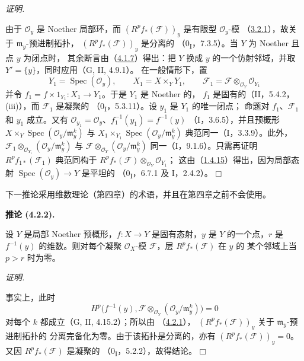 \documentclass[UTF8,fontset=none,11pt,oneside,openany]{ctexbook}
\providecommand{\square}{\mdlgwhtsquare}
\newenvironment{corollary}[1][]{%
  \par\medskip\noindent\textbf{推论 (#1).}\ %
}{\par}
\newenvironment{proof}{%
  \par\smallskip\noindent\textit{证明.}\ %
}{\hfill$\square$\par}
\let\EGAOriginalLabel\label
\renewcommand{\label}[1]{\phantomsection\EGAOriginalLabel{#1}}
\begin{document}
\begin{proof}
由于 $\mathcal O_y$ 是 Noether 局部环，而
$(R^pf_*(\mathcal F))_y$ 是有限型 $\mathcal O_y$-模
（\hyperref[III.3.2.1-fr]{3.2.1}），故关于 $\mathfrak m_y$-预进制拓扑，
$(R^pf_*(\mathcal F))_y$ 是分离的
（0\textsubscript{I}，7.3.5）。当 $Y$ 为 Noether 且点 $y$ 为闭点时，
其余断言由（\hyperref[III.4.1.7-fr]{4.1.7}）得出：把 $Y$ 换成
$y$ 的一个仿射邻域，并取 $Y'=\{y\}$，同时应用（G, II, 4.9.1）。
在一般情形下，置
\[
Y_1=\operatorname{Spec}(\mathcal O_y),\qquad
X_1=X\times_YY_1,\qquad
\mathcal F_1=\mathcal F\otimes_{\mathcal O_Y}\mathcal O_{Y_1}
\]
并令 $f_1=f\times1_{Y_1}:X_1\to Y_1$。于是 $Y_1$ 是 Noether 的，
$f_1$ 是固有的（II，5.4.2，(iii)），而 $\mathcal F_1$ 是凝聚的
（0\textsubscript{I}，5.3.11）。设 $y_1$ 是 $Y_1$ 的唯一闭点；
命题对 $f_1$、$\mathcal F_1$ 和 $y_1$ 成立。又有
$\mathcal O_{y_1}=\mathcal O_y$、$f_1^{-1}(y_1)=f^{-1}(y)$
（I，3.6.5），并且预概形
$X\times_Y\operatorname{Spec}(\mathcal O_y/\mathfrak m_y^k)$ 与
$X_1\times_{Y_1}\operatorname{Spec}(\mathcal O_y/\mathfrak m_y^k)$
典范同一（I，3.3.9）。此外，
$\mathcal F_1\otimes_{\mathcal O_{Y_1}}
(\mathcal O_y/\mathfrak m_y^k)$ 与
$\mathcal F\otimes_{\mathcal O_Y}(\mathcal O_y/\mathfrak m_y^k)$
同一（I，9.1.6）。只需再证明 $R^pf_{1*}(\mathcal F_1)$ 典范同构于
$R^pf_*(\mathcal F)\otimes_{\mathcal O_Y}\mathcal O_{Y_1}$；
这由（\hyperref[III.1.4.15-fr]{1.4.15}）得出，因为局部态射
$\operatorname{Spec}(\mathcal O_y)\to Y$ 是平坦的
（0\textsubscript{I}，6.7.1 及 I，2.4.2）。
\end{proof}

下一推论采用维数理论（第四章）的术语，并且在第四章之前不会使用。

\begin{corollary}[4.2.2]
\label{III.4.2.2-fr}
设 $Y$ 是局部 Noether 预概形，$f:X\to Y$ 是固有态射，$y$ 是
$Y$ 的一个点，$r$ 是 $f^{-1}(y)$ 的维数。则对每个凝聚
$\mathcal O_X$-模 $\mathcal F$，层 $R^pf_*(\mathcal F)$ 在 $y$ 的
某个邻域上当 $p>r$ 时为零。
\end{corollary}

\begin{proof}
事实上，此时
\[
H^p\bigl(f^{-1}(y),
\mathcal F\otimes_{\mathcal O_Y}(\mathcal O_y/\mathfrak m_y^k)\bigr)=0
\]
对每个 $k$ 都成立（G, II, 4.15.2）；所以由
（\hyperref[III.4.2.1-fr]{4.2.1}），
$(R^pf_*(\mathcal F))_y$ 关于 $\mathfrak m_y$-预进制拓扑的
分离完备化为零。由于该拓扑是分离的，亦有
$(R^pf_*(\mathcal F))_y=0$。又因 $R^pf_*(\mathcal F)$ 是凝聚的
（0\textsubscript{I}，5.2.2），故得结论。
\end{proof}
\end{document}
